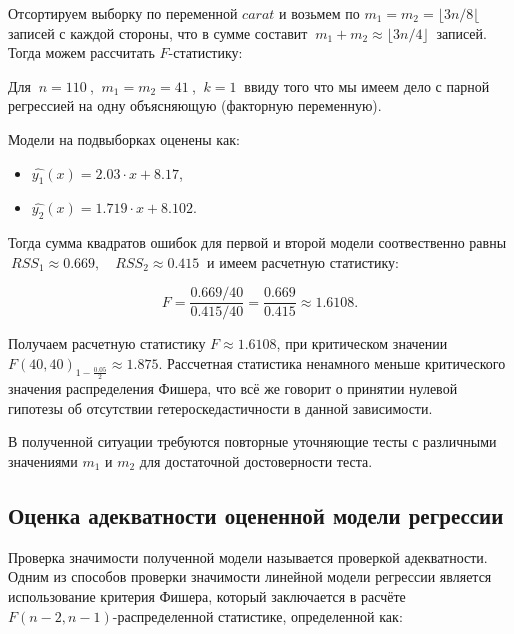 \documentclass[
]{article}
\begin{document}
Отсортируем выборку по переменной \(carat\) и возьмем по
\(m_1 = m_2 = \lfloor3n/8\lfloor\) записей с каждой стороны, что в сумме
составит \(\ m_1 + m_2 \approx \lfloor3n/4\rfloor\ \) записей. Тогда
можем рассчитать \(F\)-статистику:

Для \(\ n = 110\ \), \(\ m_1 = m_2 = 41\ \), \(\ k = 1\ \) ввиду того
что мы имеем дело с парной регрессией на одну объясняющую (факторную
переменную).

Модели на подвыборках оценены как:

\begin{itemize}
\item
  \(\hat{y_1}(x) = 2.03 \cdot x + 8.17\),
\item
  \(\hat{y_2}(x) = 1.719 \cdot x + 8.102\).
\end{itemize}

Тогда сумма квадратов ошибок для первой и второй модели соотвественно
равны \(\ RSS_1 \approx 0.669, \quad RSS_2 \approx 0.415\ \) и имеем
расчетную статистику:

\[
F = \frac{0.669 / 40}{0.415 / 40} = \frac{0.669}{0.415} \approx 1.6108.
\]

Получаем расчетную статистику \(F \approx 1.6108\), при критическом
значении \(F(40, 40)_{1 - \frac{0.05}{2}} \approx 1.875\). Рассчетная
статистика ненамного меньше критического значения распределения Фишера,
что всё же говорит о принятии нулевой гипотезы об отсутствии
гетероскедастичности в данной зависимости.

В полученной ситуации требуются повторные уточняющие тесты с различными
значениями \(m_1\) и \(m_2\) для достаточной достоверности теста.

\hypertarget{ux43eux446ux435ux43dux43aux430-ux430ux434ux435ux43aux432ux430ux442ux43dux43eux441ux442ux438-ux43eux446ux435ux43dux435ux43dux43dux43eux439-ux43cux43eux434ux435ux43bux438-ux440ux435ux433ux440ux435ux441ux441ux438ux438}{%
\subsection{\texorpdfstring{\textbf{Оценка адекватности оцененной модели
регрессии}}{Оценка адекватности оцененной модели регрессии}}\label{ux43eux446ux435ux43dux43aux430-ux430ux434ux435ux43aux432ux430ux442ux43dux43eux441ux442ux438-ux43eux446ux435ux43dux435ux43dux43dux43eux439-ux43cux43eux434ux435ux43bux438-ux440ux435ux433ux440ux435ux441ux441ux438ux438}}

Проверка значимости полученной модели называется проверкой адекватности.
Одним из способов проверки значимости линейной модели регрессии является
использование критерия Фишера, который заключается в расчёте
\(F(n-2, n-1)\)-распределенной статистике, определенной как:
\end{document}
